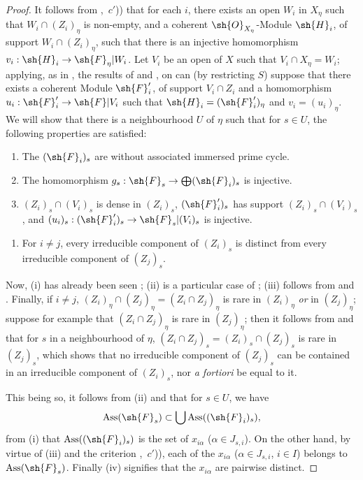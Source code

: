 \begin{proof}
\label{IV.9.8.3-proof}
It follows from ,~$c'$)) that for each $i$, there exists an open $W_i$ in $X_\eta$ such that $W_i\cap(Z_i)_\eta$ is non-empty, and a coherent $\sh{O}_{X_\eta}$-Module $\sh{H}_i$, of support $W_i\cap(Z_i)_\eta$, such that there is an injective homomorphism $v_i:\sh{H}_i\to\sh{F}_\eta|W_i$.
Let $V_i$ be an open of $X$ such that $V_i\cap X_\eta=W_i$; applying, as in , the results of  and , on can (by restricting $S$) suppose that there exists a coherent Module $\sh{F}'_i$, of support $V_i\cap Z_i$ and a homomorphism $u_i:\sh{F}'_i\to\sh{F}|V_i$ such that $\sh{H}_i=(\sh{F}'_i)_\eta$ and $v_i=(u_i)_\eta$.
We will show that there is a neighbourhood $U$ of $\eta$ such that for $s\in U$, the following properties are satisfied:
\begin{enumerate}[label=(\roman*)]
  \item The $(\sh{F}_i)_s$ are without associated immersed prime cycle.
  \item The homomorphism $g_s:\sh{F}_s\to\bigoplus(\sh{F}_i)_s$ is injective.
  \item $(Z_i)_s\cap(V_i)_s$ is dense in $(Z_i)_s$, $(\sh{F}'_i)_s$ has support $(Z_i)_s\cap(V_i)_s$, and $(u_i)_s:(\sh{F}'_i)_s\to\sh{F}_s|(V_i)_s$ is injective.
\end{enumerate}

\begin{enumerate}[label=(\roman*)]
  \item[(iv)] For $i\neq j$, every irreducible component of $(Z_i)_s$ is distinct from every irreducible component of $(Z_j)_s$.
\end{enumerate}

Now, (i) has already been seen ; (ii) is a particular case of ; (iii) follows from  and .
Finally, if $i\neq j$, $(Z_i)_\eta\cap(Z_j)_\eta=(Z_i\cap Z_j)_\eta$ is rare in $(Z_i)_\eta$ \emph{or} in $(Z_j)_\eta$; suppose for example that $(Z_i\cap Z_j)_\eta$ is rare in $(Z_j)_\eta$; then it follows from  and  that for $s$ in a neighbourhood of $\eta$, $(Z_i\cap Z_j)_s=(Z_i)_s\cap(Z_j)_s$ is rare in $(Z_j)_s$, which shows that no irreducible component of $(Z_j)_s$ can be contained in an irreducible component of $(Z_i)_s$, nor \emph{a fortiori} be equal to it.

This being so, it follows from (ii) and  that for $s\in U$, we have
\[
  \operatorname{Ass}(\sh{F}_s)\subset\bigcup\operatorname{Ass}((\sh{F}_i)_s),
\]
from (i) that $\operatorname{Ass}((\sh{F}_i)_s)$ is the set of $x_{i\alpha}$ ($\alpha\in J_{s,i}$).
On the other hand, by virtue of (iii) and the criterion ,~$c'$)), each of the $x_{i\alpha}$ ($\alpha\in J_{s,i}$, $i\in I$) belongs to $\operatorname{Ass}(\sh{F}_s)$.
Finally (iv) signifies that the $x_{i\alpha}$ are pairwise distinct.


\end{proof}
